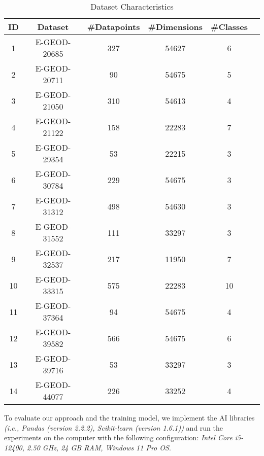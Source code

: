 \begin{table}[ht]
    \centering
    \caption{Dataset Characteristics}
    \label{tab:datasets}
    \begin{tabular}{cccccc}
        \toprule
        ID & Dataset        & \#Datapoints & \#Dimensions & \#Classes \\
        \midrule
        1  & E-GEOD-20685   & 327          & 54627        & 6  \\
        2  & E-GEOD-20711   & 90           & 54675        & 5  \\
        3  & E-GEOD-21050   & 310          & 54613        & 4  \\
        4  & E-GEOD-21122   & 158          & 22283        & 7  \\
        5  & E-GEOD-29354   & 53           & 22215        & 3  \\
        6  & E-GEOD-30784   & 229          & 54675        & 3  \\
        7  & E-GEOD-31312   & 498          & 54630        & 3  \\
        8  & E-GEOD-31552   & 111          & 33297        & 3  \\
        9  & E-GEOD-32537   & 217          & 11950        & 7  \\
        10 & E-GEOD-33315   & 575          & 22283        & 10 \\
        11 & E-GEOD-37364   & 94           & 54675        & 4  \\
        12 & E-GEOD-39582   & 566          & 54675        & 6  \\
        13 & E-GEOD-39716   & 53           & 33297        & 3  \\
        14 & E-GEOD-44077   & 226          & 33252        & 4  \\
        \bottomrule
    \end{tabular}
\end{table}

To evaluate our approach and the training model, we implement the AI libraries \textit{(i.e., Pandas (version 2.2.2),
Scikit-learn (version 1.6.1))} and run the experiments on the computer with the following configuration: \textit{Intel Core i5-12400, 2.50 GHz, 24 GB RAM, Windows 11 Pro OS}.

